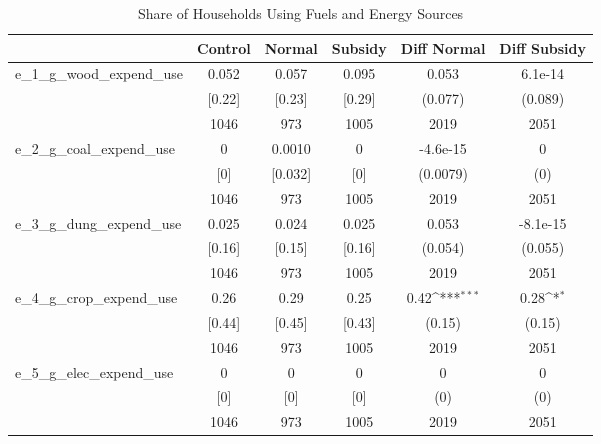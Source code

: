 \begin{table}[htbp]\centering
\def\sym#1{\ifmmode^{#1}\else\(^{#1}\)\fi}
\caption{Share of Households Using Fuels and Energy Sources \label{tab:"balance"}}
\begin{tabular*}{0.9\hsize}{@{\hskip\tabcolsep\extracolsep\fill}l*{1}{ccccc}}
\toprule
                                &  Control&   Normal&  Subsidy&Diff Normal         &Diff Subsidy         \\
\midrule
e\_1\_g\_wood\_expend\_use           &    0.052&    0.057&    0.095&    0.053         &  6.1e-14         \\
                                &   [0.22]&   [0.23]&   [0.29]&  (0.077)         &  (0.089)         \\
                                &     1046&      973&     1005&     2019         &     2051         \\
e\_2\_g\_coal\_expend\_use           &        0&   0.0010&        0& -4.6e-15         &        0         \\
                                &      [0]&  [0.032]&      [0]& (0.0079)         &      (0)         \\
                                &     1046&      973&     1005&     2019         &     2051         \\
e\_3\_g\_dung\_expend\_use           &    0.025&    0.024&    0.025&    0.053         & -8.1e-15         \\
                                &   [0.16]&   [0.15]&   [0.16]&  (0.054)         &  (0.055)         \\
                                &     1046&      973&     1005&     2019         &     2051         \\
e\_4\_g\_crop\_expend\_use           &     0.26&     0.29&     0.25&     0.42\sym{***}&     0.28\sym{*}  \\
                                &   [0.44]&   [0.45]&   [0.43]&   (0.15)         &   (0.15)         \\
                                &     1046&      973&     1005&     2019         &     2051         \\
e\_5\_g\_elec\_expend\_use           &        0&        0&        0&        0         &        0         \\
                                &      [0]&      [0]&      [0]&      (0)         &      (0)         \\
                                &     1046&      973&     1005&     2019         &     2051         \\

\end{tabular*}
\end{table}
